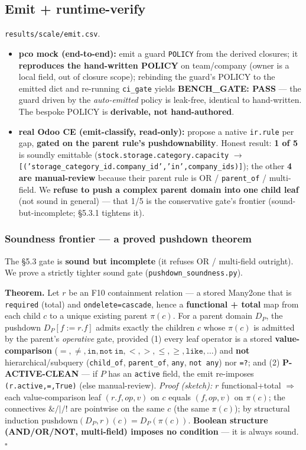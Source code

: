\documentclass[11pt,a4paper]{article}
\newcommand{\code}[1]{\texttt{#1}}
\begin{document}
\subsection{Emit + runtime-verify}
\code{results/scale/emit.csv}.
\begin{itemize}[leftmargin=*]
  \item \textbf{pco mock (end-to-end):} emit a guard \code{POLICY} from the derived closures; it
        \textbf{reproduces the hand-written POLICY} on team/company (owner is a local field, out of closure
        scope); rebinding the guard's POLICY to the emitted dict and re-running \code{ci_gate} yields
        \textbf{BENCH\_GATE: PASS} --- the guard driven by the \emph{auto-emitted} policy is leak-free,
        identical to hand-written. The bespoke POLICY is \textbf{derivable, not hand-authored}.
  \item \textbf{real Odoo CE (emit-classify, read-only):} propose a native \code{ir.rule} per gap,
        \textbf{gated on the parent rule's pushdownability}. Honest result: \textbf{1 of 5} is soundly
        emittable (\code{stock.storage.category.capacity} $\to$
        \code{[('storage_category_id.company_id','in',company_ids)]}); the other \textbf{4 are manual-review}
        because their parent rule is OR / \code{parent_of} / multi-field. We \textbf{refuse to push a complex
        parent domain into one child leaf} (not sound in general) --- that 1/5 is the conservative gate's
        frontier (sound-but-incomplete; \S5.3.1 tightens it).
\end{itemize}

\subsubsection{Soundness frontier --- a proved pushdown theorem}
The \S5.3 gate is \textbf{sound but incomplete} (it refuses OR / multi-field outright). We prove a strictly
tighter sound gate (\code{pushdown_soundness.py}).

\noindent\textbf{Theorem.} Let $r$ be an F10 containment relation --- a stored Many2one that is \code{required}
(total) and \code{ondelete=cascade}, hence a \textbf{functional + total} map from each child $c$ to a unique
existing parent $\pi(c)$. For a parent domain $D_P$, the pushdown $D_P[f := r.f]$ admits exactly the children
$c$ whose $\pi(c)$ is admitted by the parent's \emph{operative} gate, provided (1) every leaf operator is a
stored \textbf{value-comparison} ($=,\neq,\mathtt{in},\mathtt{not\ in},<,>,\le,\ge,\mathtt{like},\ldots$) and
\textbf{not} hierarchical/subquery (\code{child_of}, \code{parent_of}, \code{any}, \code{not any}) nor
\code{=?}; and (2) \textbf{P-ACTIVE-CLEAN} --- if $P$ has an \code{active} field, the emit re-imposes
\code{(r.active,=,True)} (else manual-review). \emph{Proof (sketch):} $r$ functional+total $\Rightarrow$ each
value-comparison leaf $(r.f,op,v)$ on $c$ equals $(f,op,v)$ on $\pi(c)$; the connectives $\&/|/!$ are pointwise
on the same $c$ (the same $\pi(c)$); by structural induction $\mathrm{pushdown}(D_P,r)(c)=D_P(\pi(c))$.
\textbf{Boolean structure (AND/OR/NOT, multi-field) imposes no condition} --- it is always sound. $\square$
\end{document}
